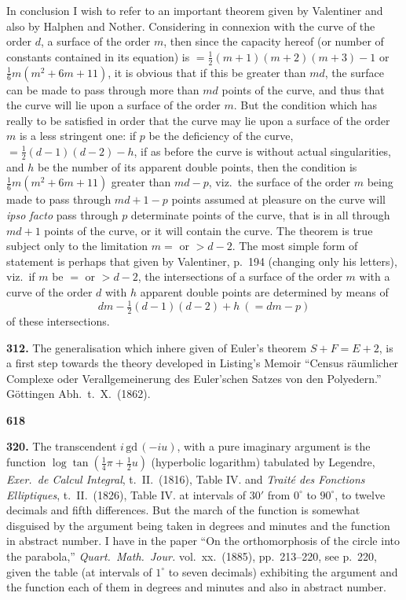 \documentclass[12pt,a4paper]{article}
\theoremstyle{plain}
\begin{document}
In conclusion I wish to refer to an important theorem given by Valentiner and also by Halphen and Nother. Considering in connexion with the curve of the order $d$, a surface of the order $m$, then since the capacity hereof (or number of constants contained in its equation) is $=\frac{1}{2}(m+1)(m+2)(m+3)-1$ or $\frac{1}{6}m(m^2+6m+11)$, it is obvious that if this be greater than $md$, the surface can be made to pass through more than $md$ points of the curve, and thus that the curve will lie upon a surface of the order $m$. But the condition which has really to be satisfied in order that the curve may lie upon a surface of the order $m$ is a less stringent one: if $p$ be the deficiency of the curve, $=\frac{1}{2}(d-1)(d-2)-h$, if as before the curve is without actual singularities, and $h$ be the number of its apparent double points, then the condition is $\frac{1}{6}m(m^2+6m+11)$ greater than $md-p$, viz.~the surface of the order $m$ being made to pass through $md+1-p$ points assumed at pleasure on the curve will \textit{ipso facto} pass through $p$ determinate points of the curve, that is in all through $md+1$ points of the curve, or it will contain the curve. The theorem is true subject only to the limitation $m=$ or $>d-2$. The most simple form of statement is perhaps that given by Valentiner, p.~194 (changing only his letters), viz.~if $m$ be $=$ or $>d-2$, the intersections of a surface of the order $m$ with a curve of the order $d$ with $h$ apparent double points are determined by means of
\[dm - \tfrac{1}{2}(d-1)(d-2) + h\ (= dm-p)\]
of these intersections.

\vspace{0.3cm}
\noindent\textbf{312.} The generalisation which inhere given of Euler's theorem $S+F=E+2$, is a first step towards the theory developed in Listing's Memoir ``Census r\"{a}umlicher Complexe oder Verallgemeinerung des Euler'schen Satzes von den Polyedern.'' G\"{o}ttingen Abh.~t.~X.~(1862).

\newpage
\noindent\textbf{618}

\vspace{0.3cm}
\noindent\textbf{320.} The transcendent $i\,\mathrm{gd}\,(-iu)$, with a pure imaginary argument is the function $\log\tan(\frac{1}{4}\pi+\frac{1}{2}u)$ (hyperbolic logarithm) tabulated by Legendre, \textit{Exer.~de Calcul Integral}, t.~II.~(1816), Table IV. and \textit{Trait\'{e} des Fonctions Elliptiques}, t.~II.~(1826), Table IV. at intervals of $30'$ from $0^{\circ}$ to $90^{\circ}$, to twelve decimals and fifth differences. But the march of the function is somewhat disguised by the argument being taken in degrees and minutes and the function in abstract number. I have in the paper ``On the orthomorphosis of the circle into the parabola,'' \textit{Quart.~Math.~Jour.} vol.~xx.~(1885), pp.~213--220, see p.~220, given the table (at intervals of $1^{\circ}$ to seven decimals) exhibiting the argument and the function each of them in degrees and minutes and also in abstract number.
\end{document}
